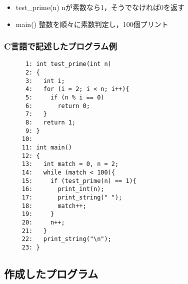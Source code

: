 \documentclass[a4j,11pt]{jarticle}
\begin{document}
\begin{itemize}
      \item test\_prime(n)    nが素数なら1，そうでなければ0を返す
      \item main()       整数を順々に素数判定し，100個プリント
\end{itemize}

\subsubsection{C言語で記述したプログラム例}

\begin{verbatim}
      1: int test_prime(int n)
      2: {
      3:   int i;
      4:   for (i = 2; i < n; i++){
      5:     if (n % i == 0)
      6:       return 0;
      7:   }
      8:   return 1;
      9: }
     10: 
     11: int main()
     12: {
     13:   int match = 0, n = 2;
     14:   while (match < 100){
     15:     if (test_prime(n) == 1){
     16:       print_int(n);
     17:       print_string(" ");
     18:       match++;
     19:     }
     20:     n++;
     21:   }
     22:   print_string("\n");
     23: }
\end{verbatim}

\subsection{作成したプログラム}
\end{document}

